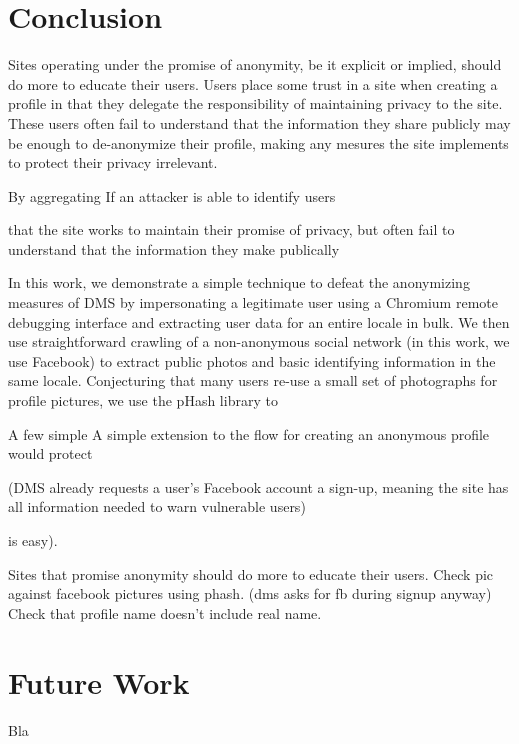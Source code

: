 \section{Conclusion}
\label{sec:conclusion}

Sites operating under the promise of anonymity, be it explicit or implied, should do more to educate their users.
Users place some trust in a site when creating a profile in that they delegate the responsibility of maintaining privacy to the site.
These users often fail to understand that the information they share publicly may be enough to de-anonymize their profile, making any mesures the site implements to protect their privacy irrelevant.

By aggregating 
If an attacker is able to identify users 


 that the site works to maintain their promise of privacy, but often fail to understand that the information they make publically 


In this work, we demonstrate a simple technique to defeat the anonymizing measures of DMS by impersonating a legitimate user using a Chromium remote debugging interface and extracting user data for an entire locale in bulk.
We then use straightforward crawling of a non-anonymous social network (in this work, we use Facebook) to extract public photos and basic identifying information in the same locale.
Conjecturing that many users re-use a small set of photographs for profile pictures, we use the pHash library to 

A few simple 
A simple extension to the flow for creating an anonymous profile would protect 

(DMS already requests a user's Facebook account a sign-up, meaning the site has all information needed to warn vulnerable users)

is easy).


Sites that promise anonymity should do more to educate their users. Check pic
against facebook pictures using phash. (dms asks for fb during signup anyway)
Check that profile name doesn't include real name.

\section{Future Work}
\label{sec:related_futurework}

Bla